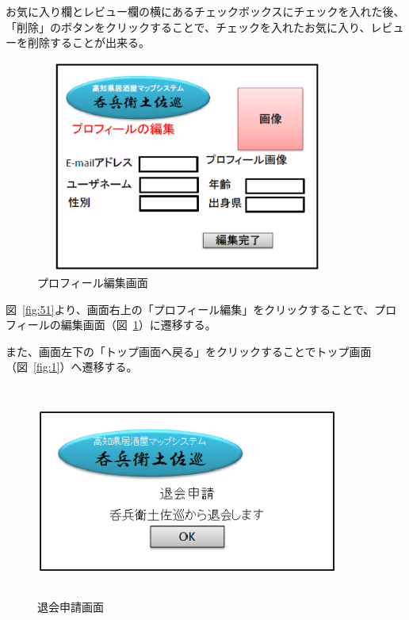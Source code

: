 \documentclass[a4j,titlepage]{jarticle}
\begin{document}
お気に入り欄とレビュー欄の横にあるチェックボックスにチェックを入れた後、「削除」のボタンをクリックすることで、チェックを入れたお気に入り、レビューを削除することが出来る。



\begin {figure}[!htbp]
    \begin{center}
    \includegraphics [height=7cm, width=10cm]{52.eps}
    \caption {プロフィール編集画面}
    \label {fig:52}
    \end{center}
\end {figure}



図~\ref{fig:51}より、画面右上の「プロフィール編集」をクリックすることで、プロフィールの編集画面（図~\ref{fig:52}）に遷移する。



また、画面左下の「トップ画面へ戻る」をクリックすることでトップ画面（図~\ref{fig:1}）へ遷移する。

\clearpage

\begin {figure}[!htbp]
    \begin{center}
    \includegraphics [height=7cm, width=10cm]{53.eps}
    \caption {退会申請画面}
    \label {fig:53}
    \end{center}
\end {figure}
\end{document}
